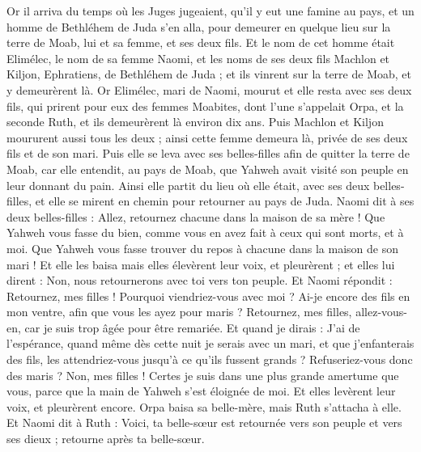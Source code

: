 \begin{multicols}{2}
\VerseOne{}Or il arriva du temps où les Juges jugeaient, qu'il y eut une famine au pays, et un homme de Bethléhem de Juda s'en alla, pour demeurer en quelque lieu sur la terre de Moab, lui et sa femme, et ses deux fils.
Et le nom de cet homme était Elimélec, le nom de sa femme Naomi, et les noms de ses deux fils Machlon et Kiljon, Ephratiens, de Bethléhem de Juda ; et ils vinrent sur la terre de Moab, et y demeurèrent là.
Or Elimélec, mari de Naomi, mourut et elle resta avec ses deux fils,
qui prirent pour eux des femmes Moabites, dont l'une s'appelait Orpa, et la seconde Ruth, et ils demeurèrent là environ dix ans.
Puis Machlon et Kiljon moururent aussi tous les deux ; ainsi cette femme demeura là, privée de ses deux fils et de son mari.
Puis elle se leva avec ses belles-filles afin de quitter la terre de Moab, car elle entendit, au pays de Moab, que Yahweh avait visité son peuple en leur donnant du pain.
Ainsi elle partit du lieu où elle était, avec ses deux belles-filles, et elle se mirent en chemin pour retourner au pays de Juda.
Naomi dit à ses deux belles-filles : Allez, retournez chacune dans la maison de sa mère ! Que Yahweh vous fasse du bien, comme vous en avez fait à ceux qui sont morts, et à moi.
Que Yahweh vous fasse trouver du repos à chacune dans la maison de son mari ! Et elle les baisa mais elles élevèrent leur voix, et pleurèrent ;
et elles lui dirent : Non, nous retournerons avec toi vers ton peuple.
Et Naomi répondit : Retournez, mes filles ! Pourquoi viendriez-vous avec moi ? Ai-je encore des fils en mon ventre, afin que vous les ayez pour maris ?
Retournez, mes filles, allez-vous-en, car je suis trop âgée pour être remariée. Et quand je dirais : J'ai de l'espérance, quand même dès cette nuit je serais avec un mari, et que j'enfanterais des fils,
les attendriez-vous jusqu'à ce qu'ils fussent grands ? Refuseriez-vous donc des maris ? Non, mes filles ! Certes je suis dans une plus grande amertume que vous, parce que la main de Yahweh s'est éloignée de moi.
Et elles levèrent leur voix, et pleurèrent encore. Orpa baisa sa belle-mère, mais Ruth s'attacha à elle.
Et Naomi dit à Ruth : Voici, ta belle-sœur est retournée vers son peuple et vers ses dieux ; retourne après ta belle-sœur.

\end{multicols}
